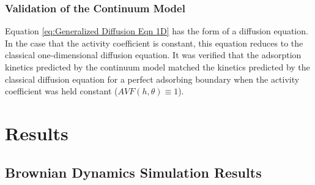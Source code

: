 \subsubsection{Validation of the Continuum Model}

Equation \ref{eq:Generalized Diffusion Eqn 1D} has the form of a
diffusion equation. In the case that the activity coefficient is constant,
this equation reduces to the classical one-dimensional diffusion equation.
It was verified that the adsorption kinetics predicted by the continuum
model matched the kinetics predicted by the classical diffusion equation
for a perfect adsorbing boundary when the activity coefficient was
held constant ($AVF\left(h,\theta\right)\equiv1$). 


\section*{Results}


\subsection{Brownian Dynamics Simulation Results}

